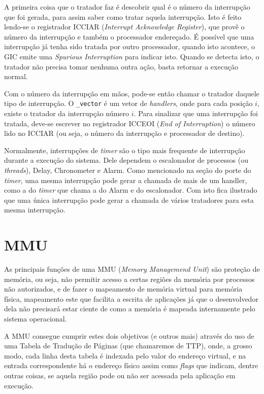 A primeira coisa que o tratador faz é descobrir qual é o número da interrupção que foi gerada, para assim saber como tratar aquela interrupção. Isto é feito lendo-se o registrador ICCIAR (\emph{Interrupt Acknowledge Register}), que provê o número da interrupção e também o processador endereçado.
É possível que uma interrupção já tenha sido tratada por outro processador, quando isto acontece, o GIC emite uma \emph{Spurious Interruption} para indicar isto. Quando se detecta isto, o tratador não precisa tomar nenhuma outra ação, basta retornar a execução normal.

Com o número da interrupção em mãos, pode-se então chamar o tratador daquele tipo de interrupção. O \verb+_vector+ é um vetor de \emph{handlers}, onde para cada posição $i$, existe o tratador da interrupção número $i$. Para sinalizar que uma interrupção foi tratada, deve-se escrever no registrador ICCEOI (\emph{End of Interruption}) o número lido no ICCIAR (ou seja, o número da interrupção e processador de destino).


Normalmente, interrupções de \emph{timer} são o tipo mais frequente de interrupção durante a execução do sistema. Dele dependem o escalonador de processos (ou \emph{threads}), Delay, Chronometer e Alarm. Como mencionado na seção do porte do \emph{timer}, uma mesma interrupção pode gerar a chamada de mais de um handler, como a do \emph{timer} que chama a do Alarm e do escalonador. Com isto fica ilustrado que uma única interrupção pode gerar a chamada de vários tratadores para esta mesma interrupção.


\section{MMU}
\label{sec:mmu}



As principais funções de uma MMU (\emph{Memory Managemend Unit}) são proteção de memória, ou seja, não permitir acesso a certas regiões da memória por processos não autorizados, e de fazer o mapeamento de memória virtual para memória física, mapeamento este que facilita a escrita de aplicações já que o desenvolvedor dela não precisará estar ciente de como a memória é mapeada internamente pelo sistema operacional.

A MMU consegue cumprir estes dois objetivos (e outros mais) através do uso de uma Tabela de Tradução de Páginas (que chamaremos de TTP), onde, a grosso modo, cada linha desta tabela é indexada pelo valor do endereço virtual, e na entrada correspondente há o endereço físico assim como \emph{flags} que indicam, dentre outras coisas, se aquela região pode ou não ser acessada pela aplicação em execução.

